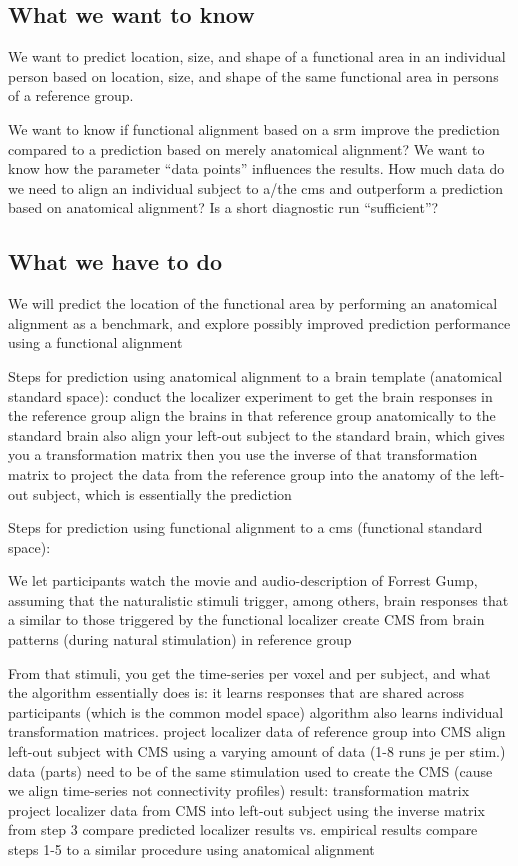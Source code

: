{\citep{chen2015reduced}


\subsection{What we want to know}
We want to predict location, size, and shape of a functional area in
an individual person based on location, size, and shape of the same functional
area in persons of a reference group.

%
We want to know if functional alignment based on a \ac{srm} improve the
prediction compared to a prediction based on merely anatomical alignment?
%
We want to know how the parameter ``data points'' influences the results.
%
How much data do we need to align an individual subject to a/the \ac{cms} and
outperform a prediction based on anatomical alignment?
%
Is a short diagnostic run ``sufficient''?

\subsection{What we have to do}

We will predict the location of the functional area by performing an
anatomical alignment as a benchmark, and explore possibly improved prediction
performance using a functional alignment

Steps for prediction using anatomical alignment to a brain template (anatomical
standard space):
%
conduct the localizer experiment to get the brain responses in the reference
group
%
align the brains in that reference group anatomically to the standard brain
%
also align your left-out subject to the standard brain, which gives you a
transformation matrix
%
then you use the inverse of that transformation matrix to project the data
%
from the reference group into the anatomy of the left-out subject, which is
essentially the prediction

Steps for prediction using functional alignment to a \ac{cms} (functional
standard space):

%
We let participants watch the movie and audio-description of Forrest Gump,
assuming that the naturalistic stimuli trigger, among others, brain responses
that a similar to those triggered by the functional localizer
%
create CMS from brain patterns (during natural stimulation) in reference group

From that stimuli, you get the time-series per voxel and per subject, and what
the algorithm essentially does is: it learns responses that are shared across
participants (which is the common model space)
%
algorithm also learns individual transformation matrices.
%
project localizer data of reference group into CMS
%
align left-out subject with CMS using a varying amount of data (1-8
%
runs je per stim.) data (parts) need to be of the same stimulation used to
create the CMS (cause we align time-series not connectivity profiles) result:
transformation matrix
%
project localizer data from CMS into left-out subject  using the inverse matrix
from step 3
%
compare predicted localizer results vs. empirical results
%
compare steps 1-5 to a similar procedure using anatomical alignment

}
